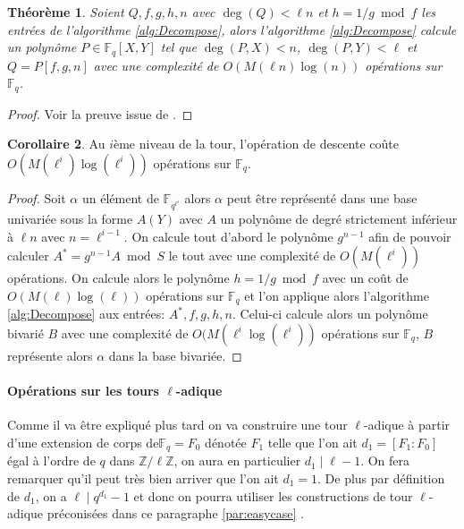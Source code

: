 \documentclass[10pt,a4paper]{book}
\theoremstyle{plain}
\newtheorem{thm}{Théorème}
\theoremstyle{definition}
\theoremstyle{definition}
\newtheorem{cor}[thm]{Corollaire}
\theoremstyle{definition}
\theoremstyle{definition}
\theoremstyle{remark}
\theoremstyle{remark}
\begin{document}
\begin{thm}
Soient $Q,f,g,h,n$ avec $\deg(Q)<\ell n$ et $h=1/g \bmod f$ les entrées de l'algorithme \ref{alg:Decompose}, alors l'algorithme \ref{alg:Decompose} calcule un polynôme $P \in \mathbb{F}_q[X,Y]$ tel que $\deg(P,X)<n$, $\deg(P,Y)<\ell$ et $Q=P[f,g,n]$ avec une complexité de $O(M(\ell n) \log(n))$ opérations sur $\mathbb{F}_q$.
\end{thm}

\begin{proof}
Voir la preuve issue de \cite{DeFeo-Doliskani-Schost13}.
\end{proof}

\begin{cor}
Au $i$ème niveau de la tour, l'opération de descente coûte $O(M(\ell^i)\log(\ell^i))$ opérations sur $\mathbb{F}_q$.
\end{cor}

\begin{proof}
Soit $\alpha$ un élément de $\mathbb{F}_{q^{\ell^i}}$ alors $\alpha$ peut être représenté dans une base univariée sous la forme $A(Y)$ avec $A$ un polynôme de degré strictement inférieur à $\ell n $ avec $n=\ell^{i-1}$. On calcule tout d'abord le polynôme $g^{n-1}$ afin de pouvoir calculer $A^*=g^{n-1}A \bmod S$ le tout avec une complexité de $O(M(\ell^i))$ opérations. On calcule alors le polynôme $h=1/g \bmod f$ avec un coût de $O(M(\ell)\log(\ell))$ opérations sur $\mathbb{F}_q$ et l'on applique alors l'algorithme \ref{alg:Decompose} aux entrées: $A^*,f,g,h,n$. Celui-ci calcule alors un polynôme bivarié $B$ avec une complexité de $O(M(\ell^i\log(\ell^i))$ opérations sur $\mathbb{F}_q$, $B$ représente alors $\alpha$ dans la base bivariée.
\end{proof}

\paragraph{Opérations sur les tours $\ell$-adique}
Comme il va être expliqué plus tard on va construire une tour $\ell$-adique à partir d'une extension de corps  de$\mathbb{F}_q=F_0$ dénotée $F_1$ telle que l'on ait $d_1=[F_1:F_0]$ égal à l'ordre de $q$ dans $\mathbb{Z}/\ell \mathbb{Z}$, on aura en particulier $d_1 \mid \ell-1$. On fera remarquer qu'il peut très bien arriver que l'on ait $d_1=1$. De plus par définition de $d_1$, on a $\ell \mid q^{d_1}-1$ et donc on pourra utiliser les constructions de tour $\ell$-adique préconisées dans ce paragraphe \ref{par:easycase} .%
\end{document}
